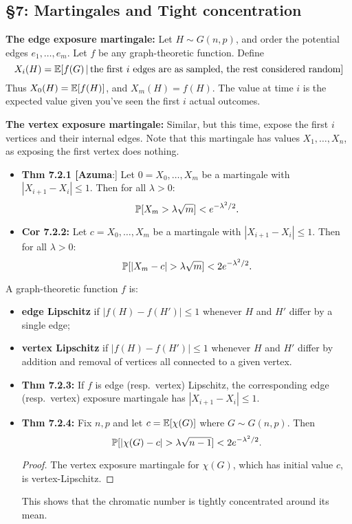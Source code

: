 \documentclass[11pt]{article}
\newenvironment{INT}[1][]{\begin{itemize}\small\item\textbf{#1}}{\end{itemize}}
\newcommand{\moreINT}[1][]{\item\textbf{#1}}
\begin{document}
\begin{chapter7}
\section*{\S7: Martingales and Tight concentration}
\begin{itemise}
\item \textbf{The edge exposure martingale:} Let $H\sim G(n,p)$, and order the potential edges $e_1,\ldots,e_m$. Let $f$ be any graph-theoretic function. Define
\[X_i(H)=\operatorname{\mathbb{E}}[f(G)\,|\,\textup{the first $i$ edges are as sampled, the rest considered random}]\]
Thus $X_0(H)=\operatorname{\mathbb{E}}[f(H)]$, and $X_m(H)=f(H)$. The value at time $i$ is the expected value given you've seen the first $i$ actual outcomes.
\item \textbf{The vertex exposure martingale:} Similar, but this time, expose the first $i$ vertices and their internal edges. Note that this martingale has values $X_1,\ldots,X_n$, as exposing the first vertex does nothing.
\begin{INT}[Thm 7.2.1 [Azuma]:]
Let $0=X_0,\ldots,X_m$ be a martingale with $|X_{i+1}-X_i|\leq1$. Then for all $\lambda>0$:
\[\operatorname{\mathbb{P}}[X_m>\lambda\sqrt m]<e^{-\lambda^2/2}.\]
\moreINT[Cor 7.2.2:]
Let $c=X_0,\ldots,X_m$ be a martingale with $|X_{i+1}-X_i|\leq1$. Then for all $\lambda>0$:
\[\Prob[|X_m-c|>\lambda\sqrt m]<2e^{-\lambda^2/2}.\]
\end{INT}
\item A graph-theoretic function $f$ is:
\begin{itemize}\squishlist
\item  \textbf{edge Lipschitz} if $|f(H)-f(H')|\leq1$ whenever $H$ and $H'$ differ by a single edge;
\item  \textbf{vertex Lipschitz} if $|f(H)-f(H')|\leq1$ whenever $H$ and $H'$ differ by addition and removal of vertices all connected to a given vertex.
\end{itemize}
\begin{INT}[Thm 7.2.3:]
If $f$ is edge (resp.\ vertex) Lipschitz, the corresponding edge (resp.\ vertex) exposure martingale has $|X_{i+1}-X_i|\leq1$.
\moreINT[Thm 7.2.4:]
Fix $n,p$ and let $c=\operatorname{\mathbb{E}}[\chi(G)]$ where $G\sim G(n,p)$. Then
\[\Prob[|\chi(G)-c|>\lambda\sqrt{n-1}]<2e^{-\lambda^2/2}.\]
\begin{proof}
The vertex exposure martingale for $\chi(G)$, which has initial value $c$, is vertex-Lipschitz.
\end{proof}
This shows that the chromatic number is tightly concentrated around its mean.

\end{INT}
\end{itemise}
\end{chapter7}
\end{document}
